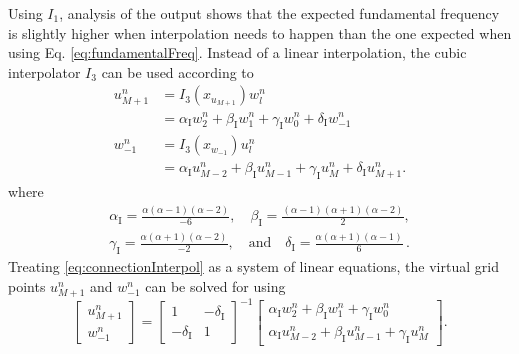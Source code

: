 \documentclass[dvipsnames, reprint]{JASA}
\begin{document}
Using $I_1$, analysis of the output shows that the expected fundamental frequency is slightly higher when interpolation needs to happen than the one expected when using Eq. \eqref{eq:fundamentalFreq}. Instead of a linear interpolation, the cubic interpolator $I_3$ can be used according to 
\begin{equation}\label{eq:connectionInterpol}
    \begin{aligned}
        u_{M+1}^n &= I_3(x_{u_{M+1}})w_l^n\\
        &= \alpha_\text{I}w_2^n + \beta_\text{I}w_1^n + \gamma_\text{I}w_0^n + \delta_\text{I} w_{-1}^n\\
        w_{-1}^n &= I_3(x_{w_{-1}})u_l^n \\
        &=\alpha_\text{I} u_{M-2}^n + \beta_\text{I}u_{M-1}^n+ \gamma_\text{I}u_M^n + \delta_\text{I} u_{M+1}^n.
    \end{aligned}
\end{equation}
where
\begin{gather*}
    \alpha_\text{I} = \frac{\alpha(\alpha - 1)(\alpha - 2)}{-6}, \quad \beta_\text{I} = \frac{(\alpha - 1)(\alpha + 1)(\alpha - 2)}{2},\\
    \gamma_\text{I} = \frac{\alpha(\alpha + 1)(\alpha - 2)}{-2}, \quad \text{and} \quad\delta_\text{I} = \frac{\alpha(\alpha + 1)(\alpha - 1)}{6}\,.
\end{gather*}
Treating \eqref{eq:connectionInterpol} as a system of linear equations, the virtual grid points $u_{M+1}^n$ and $w_{-1}^n$ can be solved for using
\begin{equation}
    \begin{bmatrix}
    u_{M+1}^n \\
    w_{-1}^n
    \end{bmatrix}
    =
     \begin{bmatrix}
         1 & -\delta_\text{I} \\
         -\delta_\text{I} & 1
    \end{bmatrix}^{-1}\begin{bmatrix}
    \alpha_\text{I} w_2^n+ \beta_\text{I}w_1^n + \gamma_\text{I}w_0^n \\
    \alpha_\text{I} u_{M-2}^n + \beta_\text{I}u_{M-1}^n + \gamma_\text{I} u_{M}^n
    \end{bmatrix}.
\end{equation}
\end{document}
